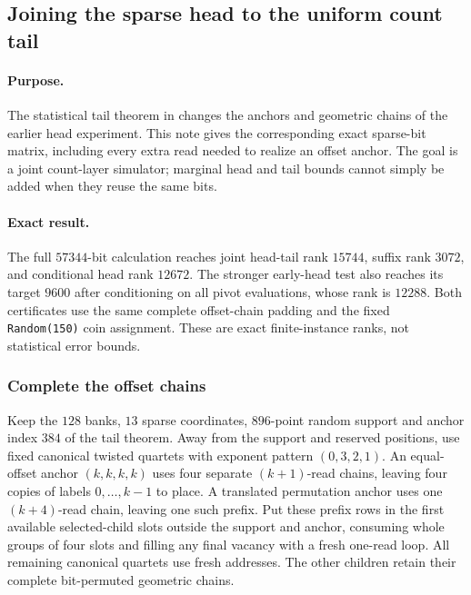 \subsection{Joining the sparse head to the uniform count tail}\label{note:zk-count-completed-head}

\paragraph{Purpose.} The statistical tail theorem in  changes the anchors and geometric chains of the earlier head experiment. This note gives the corresponding exact sparse-bit matrix, including every extra read needed to realize an offset anchor. The goal is a joint count-layer simulator; marginal head and tail bounds cannot simply be added when they reuse the same bits.

\paragraph{Exact result.} The full $57344$-bit calculation reaches joint head-tail rank $15744$, suffix rank $3072$, and conditional head rank $12672$. The stronger early-head test also reaches its target $9600$ after conditioning on all pivot evaluations, whose rank is $12288$. Both certificates use the same complete offset-chain padding and the fixed \texttt{Random(150)} coin assignment. These are exact finite-instance ranks, not statistical error bounds.

\subsubsection{Complete the offset chains}

Keep the $128$ banks, $13$ sparse coordinates, $896$-point random support and anchor index $384$ of the tail theorem. Away from the support and reserved positions, use fixed canonical twisted quartets with exponent pattern $(0,3,2,1)$. An equal-offset anchor $(k,k,k,k)$ uses four separate $(k+1)$-read chains, leaving four copies of labels $0,\ldots,k-1$ to place. A translated permutation anchor uses one $(k+4)$-read chain, leaving one such prefix. Put these prefix rows in the first available selected-child slots outside the support and anchor, consuming whole groups of four slots and filling any final vacancy with a fresh one-read loop. All remaining canonical quartets use fresh addresses. The other children retain their complete bit-permuted geometric chains.

